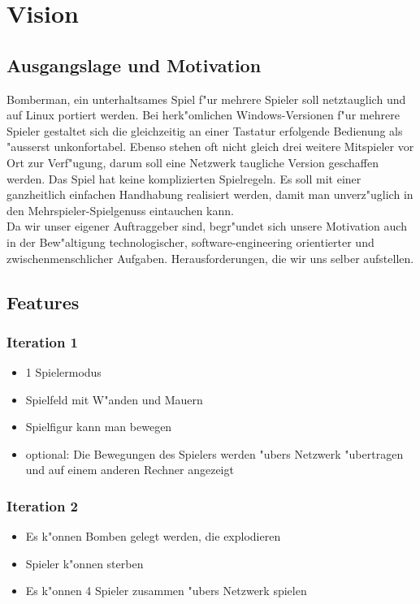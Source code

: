 \chapter{Vision}

\section{Ausgangslage und Motivation}

Bomberman, ein unterhaltsames Spiel f"ur mehrere Spieler soll netztauglich und auf Linux portiert werden.
Bei herk"omlichen Windows-Versionen f"ur mehrere Spieler gestaltet sich
die gleichzeitig an einer Tastatur erfolgende Bedienung als "ausserst unkonfortabel. Ebenso stehen oft nicht
gleich drei weitere Mitspieler vor Ort zur Verf"ugung, darum soll eine Netzwerk taugliche Version geschaffen werden.
Das Spiel hat keine komplizierten Spielregeln.
Es soll mit einer ganzheitlich einfachen Handhabung realisiert werden, damit man unverz"uglich in
den Mehrspieler-Spielgenuss eintauchen kann.
\\
Da wir unser eigener Auftraggeber sind, begr"undet sich unsere Motivation auch in der Bew"altigung technologischer,
software-engineering orientierter und zwischenmenschlicher Aufgaben. Herausforderungen, die wir uns selber aufstellen.

\section{Features}

\subsection{Iteration 1}
\begin{itemize}{}{}
\item 1 Spielermodus
\item Spielfeld mit W"anden und Mauern
\item Spielfigur kann man bewegen
\item optional: Die Bewegungen des Spielers werden "ubers Netzwerk "ubertragen und auf einem anderen Rechner angezeigt
\end{itemize}

\subsection{Iteration 2}
\begin{itemize}{}{}
\item Es k"onnen Bomben gelegt werden, die explodieren
\item Spieler k"onnen sterben
\item Es k"onnen 4 Spieler zusammen "ubers Netzwerk spielen
\end{itemize}

